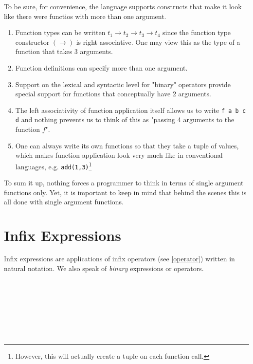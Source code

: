 To be sure, for convenience, the language supports constructs that make it look like there were functios with more than one argument.
\begin{enumerate}
\item Function types can be written $t_1 \rightarrow{} t_2 \rightarrow{} t_3 \rightarrow{} t_4$ since the function type constructor $(\rightarrow)$ is right associative. One may view this as the type of a function that takes 3 arguments.
\item Function definitions can specify more than one argument.
\item Support on the lexical and syntactic level for "binary" operators provide special support for functions that conceptually have 2 arguments.
\item The left associativity of function application itself allows us to write \texttt{f a b c d} and nothing prevents us to think of this as "passing 4 arguments to the function $f$".
\item One can always write its own functions so that they take a tuple of values, which makes function application look very much like in conventional languages, e.g. \texttt{add(1,3)}\footnote{However, this will actually create a tuple on each function call.}
\end{enumerate}

To sum it up, nothing forces a \frege{} programmer to think in terms of single argument functions only.
Yet, it is important to keep in mind that behind the scenes this is all done with single argument functions.

\section{Infix Expressions} \label{binex}

Infix expressions are applications of infix operators (see \autoref{operator}) written in natural notation. We also speak of  \emph{binary} expressions or operators.

\begin{flushleft}
 \\
 \\
               
   \alt {}  
   \alt {}   
   \alt {}\\
    \\
   \\
  \\
\end{flushleft}

